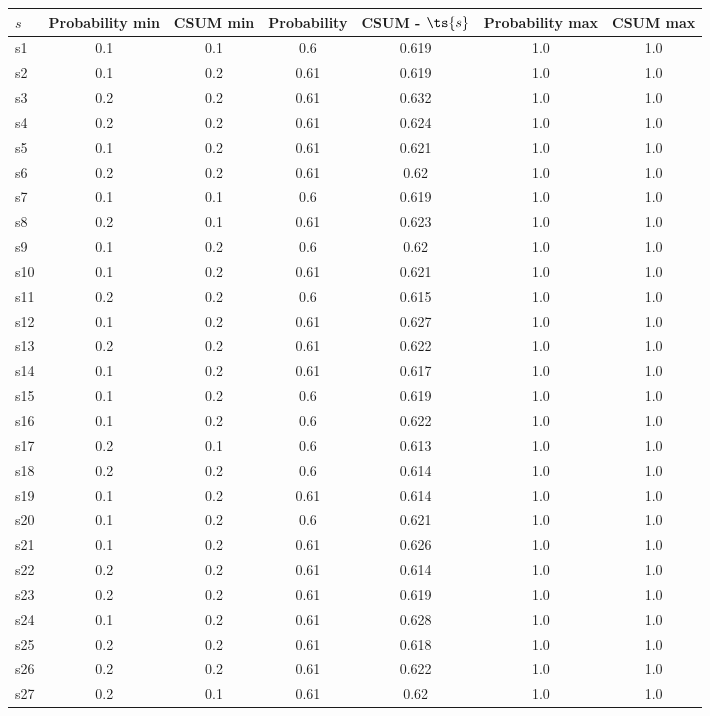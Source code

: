 \documentclass{article}
\begin{document}
\noindent\begin{tabular}{|l|c|c|c|c|c|c|}
\hline
$s$& Probability min & CSUM min & Probability & CSUM - $\ts{s}$ & Probability max & CSUM max\\
\hline
s1 &0.1 & 0.1 & 0.6 & 0.619 & 1.0 & 1.0\\
\hline
s2 &0.1 & 0.2 & 0.61 & 0.619 & 1.0 & 1.0\\
\hline
s3 &0.2 & 0.2 & 0.61 & 0.632 & 1.0 & 1.0\\
\hline
s4 &0.2 & 0.2 & 0.61 & 0.624 & 1.0 & 1.0\\
\hline
s5 &0.1 & 0.2 & 0.61 & 0.621 & 1.0 & 1.0\\
\hline
s6 &0.2 & 0.2 & 0.61 & 0.62 & 1.0 & 1.0\\
\hline
s7 &0.1 & 0.1 & 0.6 & 0.619 & 1.0 & 1.0\\
\hline
s8 &0.2 & 0.1 & 0.61 & 0.623 & 1.0 & 1.0\\
\hline
s9 &0.1 & 0.2 & 0.6 & 0.62 & 1.0 & 1.0\\
\hline
s10 &0.1 & 0.2 & 0.61 & 0.621 & 1.0 & 1.0\\
\hline
s11 &0.2 & 0.2 & 0.6 & 0.615 & 1.0 & 1.0\\
\hline
s12 &0.1 & 0.2 & 0.61 & 0.627 & 1.0 & 1.0\\
\hline
s13 &0.2 & 0.2 & 0.61 & 0.622 & 1.0 & 1.0\\
\hline
s14 &0.1 & 0.2 & 0.61 & 0.617 & 1.0 & 1.0\\
\hline
s15 &0.1 & 0.2 & 0.6 & 0.619 & 1.0 & 1.0\\
\hline
s16 &0.1 & 0.2 & 0.6 & 0.622 & 1.0 & 1.0\\
\hline
s17 &0.2 & 0.1 & 0.6 & 0.613 & 1.0 & 1.0\\
\hline
s18 &0.2 & 0.2 & 0.6 & 0.614 & 1.0 & 1.0\\
\hline
s19 &0.1 & 0.2 & 0.61 & 0.614 & 1.0 & 1.0\\
\hline
s20 &0.1 & 0.2 & 0.6 & 0.621 & 1.0 & 1.0\\
\hline
s21 &0.1 & 0.2 & 0.61 & 0.626 & 1.0 & 1.0\\
\hline
s22 &0.2 & 0.2 & 0.61 & 0.614 & 1.0 & 1.0\\
\hline
s23 &0.2 & 0.2 & 0.61 & 0.619 & 1.0 & 1.0\\
\hline
s24 &0.1 & 0.2 & 0.61 & 0.628 & 1.0 & 1.0\\
\hline
s25 &0.2 & 0.2 & 0.61 & 0.618 & 1.0 & 1.0\\
\hline
s26 &0.2 & 0.2 & 0.61 & 0.622 & 1.0 & 1.0\\
\hline
s27 &0.2 & 0.1 & 0.61 & 0.62 & 1.0 & 1.0\\

\end{tabular}
\end{document}
